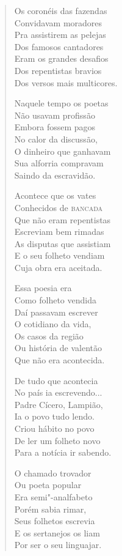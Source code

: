 \begin{verse}
Os coronéis das fazendas \\
Convidavam moradores \\
Pra assistirem as pelejas \\
Dos famosos cantadores \\
Eram os grandes desafios \\
Dos repentistas bravios \\
Dos versos mais multicores. 

Naquele tempo os poetas \\
Não usavam profissão \\
Embora fossem pagos \\
No calor da discussão, \\
O dinheiro que ganhavam \\
Sua alforria compravam \\
Saindo da escravidão. 

Acontece que os vates \\
Conhecidos de \textsc{bancada} \\
Que não eram repentistas \\
Escreviam bem rimadas \\
As disputas que assistiam \\
E o seu folheto vendiam \\
Cuja obra era aceitada. 


Essa poesia era \\
Como folheto vendida \\
Daí passavam escrever \\
O cotidiano da vida, \\
Os casos da região \\
Ou história de valentão \\
Que não era acontecida. 

De tudo que acontecia \\
No país ia escrevendo... \\
Padre Cícero, Lampião, \\
Ia o povo tudo lendo. \\
Criou hábito no povo \\
De ler um folheto novo \\
Para a notícia ir sabendo. 

O chamado trovador \\
Ou poeta popular \\
Era semi"-analfabeto \\
Porém sabia rimar, \\
Seus folhetos escrevia \\
E os sertanejos os liam \\
Por ser o seu linguajar. 


\end{verse}
